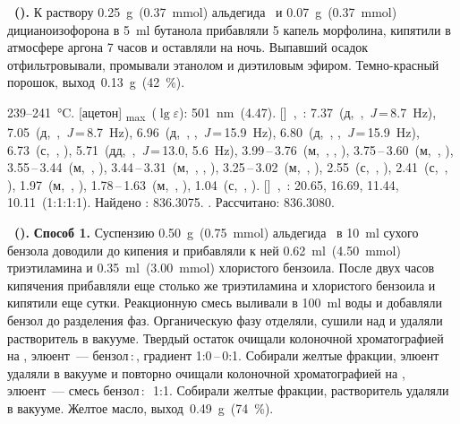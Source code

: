 \textbf{~().} К раствору \SI{0.25}{\gram}~(\SI{0.37}{\mmol}) альдегида~\textbf{} и \SI{0.07}{\gram}~(\SI{0.37}{\mmol}) дицианоизофорона в \SI{5}{\milli\litre} бутанола прибавляли 5 капель морфолина, кипятили в атмосфере аргона 7 часов и оставляли на ночь. Выпавший осадок отфильтровывали, промывали этанолом и диэтиловым эфиром. Темно-красный порошок, выход~\SI{0.13}{\gram}~(\SI{42}{\percent}).
\begin{experimental}
     239--\SI{241}{\celsius}.
    [ацетон] \chemlambda\textsubscript{max}~($\lg \varepsilon$): \SI{501}{\nano\metre}~(4.47).
    []~\chemdelta,~\si{\ppm}: 7.37~(д,~,~\textit{J}\,=\,8.7~\si{\hertz}), 7.05~(д,~,~\textit{J}\,=\,8.7~\si{\hertz}), 6.96~(д,~, ,~\textit{J}\,=\,15.9~\si{\hertz}), 6.80~(д,~, ,~\textit{J}\,=\,15.9~\si{\hertz}), 6.73~(с,~, ), 5.71~(дд,~,~\textit{J}\,=\,13.0, 5.6~\si{\hertz}), 3.99\,--\,3.76~(м,~, , ), 3.75\,--\,3.60~(м,~, ), 3.55\,--\,3.44~(м,~, ), 3.44\,--\,3.31~(м,~, , ), 3.25\,--\,3.02~(м,~, ), 2.55~(с,~, ), 2.41~(с,~, ), 1.97~(м,~, ), 1.78\,--\,1.63~(м,~, ), 1.04~(с,~, ).
    []~\chemdelta,~\si{\ppm}: 20.65, 16.69, 11.44, 10.11~(1:1:1:1).
     Найдено \ce{[M+]}: \num{836.3075}. . Рассчитано:  \num{836.3080}.
\end{experimental}

\textbf{~().} \textbf{Способ 1.} Суспензию \SI{0.50}{\gram}~(\SI{0.75}{\mmol}) альдегида~\textbf{} в \SI{10}{\milli\litre} сухого бензола доводили до кипения и прибавляли к ней \SI{0.62}{\milli\litre}~(\SI{4.50}{\mmol}) триэтиламина и \SI{0.35}{\milli\litre}~(\SI{3.00}{\mmol}) хлористого бензоила. После двух часов кипячения прибавляли еще столько же триэтиламина и хлористого бензоила и кипятили еще сутки. Реакционную смесь выливали в \SI{100}{\milli\litre} воды и добавляли бензол до разделения фаз. Органическую фазу отделяли, сушили над  и удаляли растворитель в вакууме. Твердый остаток очищали колоночной хроматографией на , элюент~--- бензол\,:\,, градиент 1:0\,--\,0:1. Собирали желтые фракции, элюент удаляли в вакууме и повторно очищали колоночной хроматографией на , элюент~--- смесь бензол\,:\,~1:1. Собирали желтые фракции, растворитель удаляли в вакууме. Желтое масло, выход~\SI{0.49}{\gram}~(\SI{74}{\percent}).

